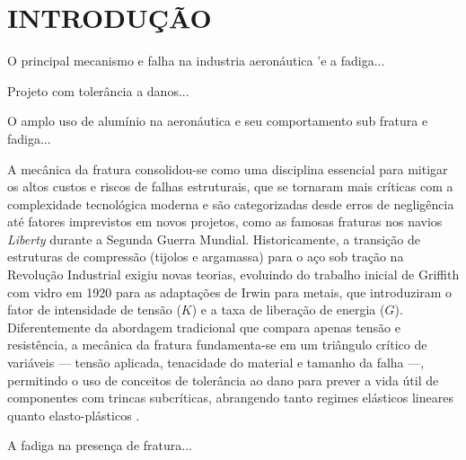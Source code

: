 \section{\MakeUppercase{Introdução}}

	O principal mecanismo e falha na industria aeronáutica 'e a fadiga...
	
	Projeto com tolerância a danos...
	
	O amplo uso de alumínio na aeronáutica e seu comportamento sub fratura e fadiga...
	
    A mecânica da fratura consolidou-se como uma disciplina essencial para mitigar os altos custos e riscos de falhas estruturais, que se tornaram mais críticas com a complexidade tecnológica moderna e são categorizadas desde erros de negligência até fatores imprevistos em novos projetos, como as famosas fraturas nos navios \textit{Liberty} durante a Segunda Guerra Mundial. Historicamente, a transição de estruturas de compressão (tijolos e argamassa) para o aço sob tração na Revolução Industrial exigiu novas teorias, evoluindo do trabalho inicial de Griffith com vidro em 1920 para as adaptações de Irwin para metais, que introduziram o fator de intensidade de tensão ($K$) e a taxa de liberação de energia ($G$). Diferentemente da abordagem tradicional que compara apenas tensão e resistência, a mecânica da fratura fundamenta-se em um triângulo crítico de variáveis — tensão aplicada, tenacidade do material e tamanho da falha —, permitindo o uso de conceitos de tolerância ao dano para prever a vida útil de componentes com trincas subcríticas, abrangendo tanto regimes elásticos lineares quanto elasto-plásticos \cite{anderson2005fracture}. 
    
    A fadiga na presença de fratura...\cite{anderson2005fracture}

	